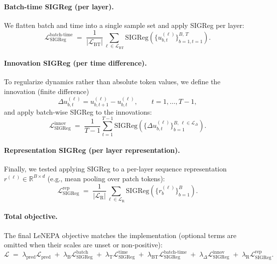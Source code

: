 \paragraph{Batch-time SIGReg (per layer).}
We flatten batch and time into a single sample set and apply SIGReg per layer:
\begin{equation}
  \mathcal{L}_{\text{SIGReg}}^{\text{batch-time}}
  \;=\;
  \frac{1}{|\mathcal{L}_{\text{BT}}|}\sum_{\ell\in\mathcal{L}_{\text{BT}}}
  \mathrm{SIGReg}\!\left(\{u^{(\ell)}_{b,t}\}_{b=1,t=1}^{B,\,T}\right).
\label{eq:sigreg_batch_time}
\end{equation}

\paragraph{Innovation SIGReg (per time difference).}
To regularize dynamics rather than absolute token values, we define the innovation (finite difference)
\begin{equation}
  \Delta u^{(\ell)}_{b,t} = u^{(\ell)}_{b,t+1} - u^{(\ell)}_{b,t},\qquad t=1,\dots,T-1,
\label{eq:sigreg_innov_def}
\end{equation}
and apply batch-wise SIGReg to the innovations:
\begin{equation}
  \mathcal{L}_{\text{SIGReg}}^{\text{innov}}
  \;=\;
  \frac{1}{T-1}\sum_{t=1}^{T-1}
  \mathrm{SIGReg}\!\left(\{\Delta u^{(\ell)}_{b,t}\}_{b=1}^{B,\ \ell\in\mathcal{L}_{\Delta}}\right).
\label{eq:sigreg_innov}
\end{equation}

\paragraph{Representation SIGReg (per layer representation).}
Finally, we tested applying SIGReg to a per-layer sequence representation $r^{(\ell)}\in\mathbb{R}^{B\times d}$ (e.g., mean pooling over patch tokens):
\begin{equation}
  \mathcal{L}_{\text{SIGReg}}^{\text{rep}}
  \;=\;
  \frac{1}{|\mathcal{L}_{\text{R}}|}\sum_{\ell\in\mathcal{L}_{\text{R}}}
  \mathrm{SIGReg}\!\left(\{r^{(\ell)}_{b}\}_{b=1}^{B}\right).
\label{eq:sigreg_rep}
\end{equation}

\paragraph{Total objective.}
The final LeNEPA objective matches the implementation (optional terms are omitted when their scales are unset or non-positive):
\begin{equation}
  \mathcal{L}
  \;=\;
  \lambda_{\text{pred}}\mathcal{L}_{\text{pred}}
  \;+\;
  \lambda_{\text{B}}\mathcal{L}_{\text{SIGReg}}^{\text{batch}}
  \;+\;
  \lambda_{\text{T}}\mathcal{L}_{\text{SIGReg}}^{\text{time}}
  \;+\;
  \lambda_{\text{BT}}\mathcal{L}_{\text{SIGReg}}^{\text{batch-time}}
  \;+\;
  \lambda_{\Delta}\mathcal{L}_{\text{SIGReg}}^{\text{innov}}
  \;+\;
  \lambda_{\text{R}}\mathcal{L}_{\text{SIGReg}}^{\text{rep}}.
\label{eq:sigreg_total}
\end{equation}

